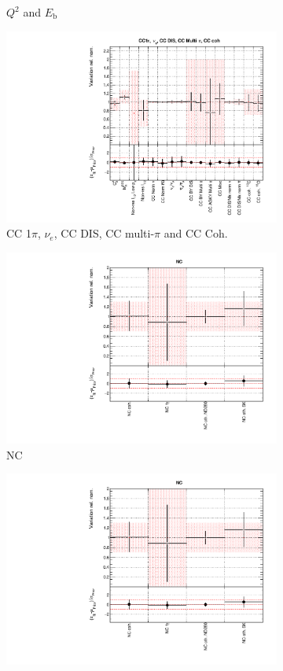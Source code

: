 \begin{figure}[!htbp]
\begin{subfigure}{0.49\textwidth}
  \caption{$Q^2$ and $E_{\mathrm{b}}$}
\end{subfigure}
\begin{subfigure}{0.49\textwidth}
  \centering
  \includegraphics[width=0.9\linewidth]{figs/asmvxsecpoly3}
  \caption{CC 1$\pi$, $\nu_e$, CC DIS, CC multi-$\pi$ and CC Coh.}
\end{subfigure}
\begin{subfigure}{0.49\textwidth}
  \centering
  \includegraphics[width=0.9\linewidth]{figs/asmvxsecpoly4}
  \caption{NC}
\end{subfigure}
\begin{subfigure}{0.49\textwidth}
  \centering
  \includegraphics[width=0.9\linewidth]{figs/asmvxsecpoly4}

\end{subfigure}
\end{figure}
